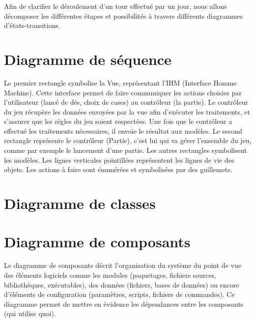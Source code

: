 Afin de clarifier le déroulement d’un tour effectué par un jour, nous allons décomposer les différentes étapes et possibilités à travers différents diagrammes d’états-transitions.

\section{Diagramme de séquence}

Le premier rectangle symbolise la Vue, représentant l’IHM (Interface Homme Machine). Cette interface permet de faire communiquer les actions choisies par l’utilisateur (lancé de dés, choix de cases) au contrôleur (la partie). Le contrôleur du jeu récupère les données envoyées par la vue afin d'exécuter les traitements, et s'assurer que les règles du jeu soient respectées. Une fois que le contrôleur a effectué les traitements nécessaires, il envoie le résultat aux modèles. Le second rectangle représente le contrôleur (Partie), c'est lui qui va gérer l'ensemble du jeu, comme par exemple le lancement d'une partie. Les autres rectangles symbolisent les modèles. Les  lignes verticales pointillées représentent les lignes de vie des objets. Les actions à faire sont énumérées et symbolisées par des  guillemets.

\section{Diagramme de classes}

\section{Diagramme de composants}

Le diagramme de composants décrit l'organisation du système du point de vue des éléments logiciels comme les modules (paquetages, fichiers sources, bibliothèques, exécutables), des données (fichiers, bases de données) ou encore d'éléments de configuration (paramètres, scripts, fichiers de commandes). Ce diagramme permet de mettre en évidence les dépendances entre les composants (qui utilise quoi).